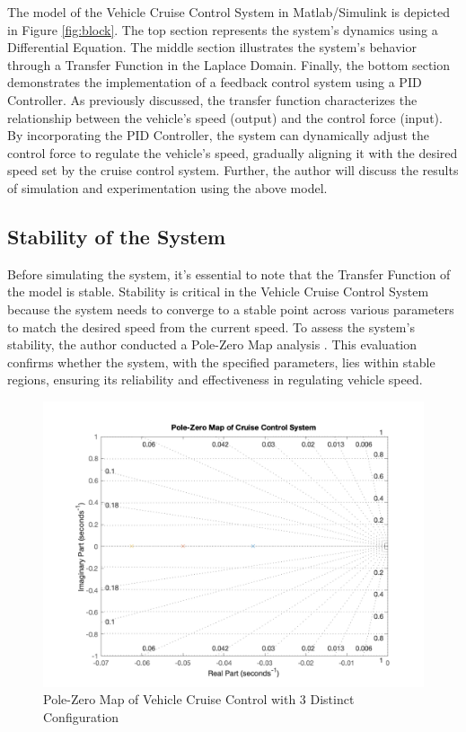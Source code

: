 \documentclass{article}
\begin{document}
The model of the Vehicle Cruise Control System in Matlab/Simulink is depicted in Figure \ref{fig:block}. The top section represents the system's dynamics using a Differential Equation. The middle section illustrates the system's behavior through a Transfer Function in the Laplace Domain. Finally, the bottom section demonstrates the implementation of a feedback control system using a PID Controller. As previously discussed, the transfer function characterizes the relationship between the vehicle's speed (output) and the control force (input). By incorporating the PID Controller, the system can dynamically adjust the control force to regulate the vehicle's speed, gradually aligning it with the desired speed set by the cruise control system. Further, the author will discuss the results of simulation and experimentation using the above model.

\subsection{Stability of the System}

Before simulating the system, it's essential to note that the Transfer Function of the model is stable. Stability is critical in the Vehicle Cruise Control System because the system needs to converge to a stable point across various parameters to match the desired speed from the current speed. To assess the system's stability, the author conducted a Pole-Zero Map analysis \cite{pzmap:2005}. This evaluation confirms whether the system, with the specified parameters, lies within stable regions, ensuring its reliability and effectiveness in regulating vehicle speed.

\begin{figure}[htbp]
    \centering
    \includegraphics[width=0.7\linewidth]{img/pzmap_cc.png}
    \caption{Pole-Zero Map of Vehicle Cruise Control with 3 Distinct Configuration}
    \label{fig:pzmap}
\end{figure}
\end{document}
